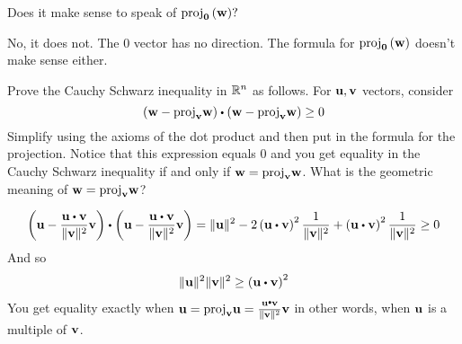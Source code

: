 \begin{enumialphparenastyle}
\begin{ex} Does it make sense to speak of $\mbox{proj}_{{\bf 0}}\left( {\bf w}\right) ?$
\begin{sol}
No, it does not. The $0$ vector has no direction. The formula for $\mbox{proj}_{{\bf 0}}\left( {\bf w}\right)$ doesn't make sense either.
\end{sol}
\end{ex}

\begin{ex} Prove the Cauchy Schwarz inequality in $\mathbb{R}^{n}$ as follows.
For ${\bf u},{\bf v}$ vectors, consider 
\begin{equation*}
\left( \vect{w}-
\func{proj}_{\vect{v}}\vect{w}\right) \dotprod \left( \vect{w}-
\func{proj}_{\vect{v}}\vect{w}\right) \geq 0
\end{equation*}
Simplify using the axioms of the dot product and then put in the formula
for the projection. Notice that this expression equals $0$ and you get equality
in the Cauchy Schwarz inequality if and only if 
${\bf w}=\mbox{proj}_{{\bf v}}{\bf w}$. What is the geometric meaning of 
${\bf w}=\mbox{proj}_{{\bf v}}{\bf w}$?
\begin{sol}
\[
\left( \vect{u}-\frac{\vect{u}\dotprod \vect{v}}{\vectlength \vect{v}\vectlength
^{2}}\vect{v}\right) \dotprod \left( \vect{u}-\frac{\vect{u}\dotprod \vect{v}}{\vectlength \vect{v}\vectlength ^{2}}\vect{v}\right) =\vectlength \vect{u
}\vectlength ^{2}-2\left( \vect{u}\dotprod \vect{v}\right) ^{2}\frac{1}{\vectlength
\vect{v}\vectlength ^{2}}+\left( \vect{u}\dotprod \vect{v}\right) ^{2}\frac{1}{
\vectlength \vect{v}\vectlength ^{2}}\geq 0
\]
And so
\[
\vectlength \vect{u}\vectlength ^{2}\vectlength \vect{v}\vectlength
^{2}\geq \left( \vect{u}\dotprod \vect{v}\right) ^{2}
\]
You get equality exactly when $\vect{u}=\func{proj}_{\vect{v}}\vect{u}
= \frac{\vect{u}\dotprod \vect{v}}{\vectlength \vect{v}\vectlength ^{2}}\vect{v}$
in other words, when ${\bf u}$ is a multiple of ${\bf v}$.
\end{sol}
\end{ex}



\end{enumialphparenastyle}
